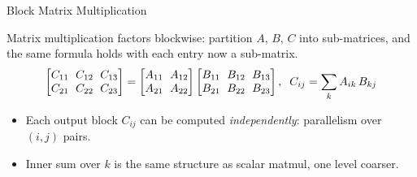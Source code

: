 \begin{frame}{Block Matrix Multiplication}

  Matrix multiplication factors blockwise: partition $A$, $B$, $C$ into sub-matrices, and the same formula holds with each entry now a sub-matrix.
  \vspace{-0.3em}
  \[
    \setlength{\arraycolsep}{3pt}
    \begin{bmatrix} C_{11} & C_{12} & C_{13} \\ C_{21} & C_{22} & C_{23} \end{bmatrix}
    =
    \begin{bmatrix} A_{11} & A_{12} \\ A_{21} & A_{22} \end{bmatrix}
    \begin{bmatrix} B_{11} & B_{12} & B_{13} \\ B_{21} & B_{22} & B_{23} \end{bmatrix}
    , \;\; C_{ij} = \sum_{k} A_{ik}\, B_{kj}
  \]

  \vspace{-0.4em}
  \begin{itemize}\small
    \item Each output block $C_{ij}$ can be computed \emph{independently}: parallelism over $(i,j)$ pairs.
    \item Inner sum over $k$ is the same structure as scalar matmul, one level coarser.
  \end{itemize}

  \vspace{0.2em}
  \centering
\end{frame}

